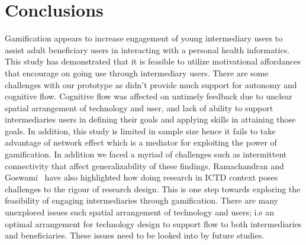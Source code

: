 \documentclass{sig-alternate}
\begin{document}
\section{Conclusions}
Gamification appears to increase engagement of young intermediary users to assist adult beneficiary users in interacting with a personal health informatics. This study has demonstrated that it is feasible to utilize motivational affordances that encourage on going use through intermediary users. There are some challenges with our prototype as didn't provide much support for autonomy and cognitive flow. Cognitive flow was affected on untimely feedback due to unclear spatial arrangement of technology and user, and lack of ability to support intermediaries users in defining their goals and applying skills in attaining those goals. In addition, this study is limited in sample size hence it fails to take advantage of network effect which is a mediator for exploiting the power of gamification. In addition we faced a myriad of challenges such as intermittent connectivity that affect generalizability of these findings. Ramachandran and Goswami~\cite{ramachandran2010research} have also highlighted how doing research in ICTD context poses challenges to the rigour of research design. This is one step towards exploring the feasibility of engaging intermediaries through gamification. There are many unexplored issues such spatial arrangement of technology and users; i.e an optimal arrangement for technology design to support flow to both intermediaries and beneficiaries. These issues need to be looked into by future studies.



%

%
%
\end{document}
